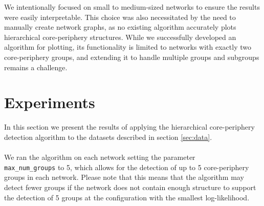 \documentclass[sigconf]{acmart}
\begin{document}
We intentionally focused on small to medium-sized networks to ensure the results were easily interpretable. This choice was also necessitated by the need to manually create network graphs, as no existing algorithm accurately plots hierarchical core-periphery structures. While we successfully developed an algorithm for plotting, its functionality is limited to networks with exactly two core-periphery groups, and extending it to handle multiple groups and subgroups remains a challenge.

\section{Experiments}

In this section we present the results of applying the hierarchical core-periphery detection algorithm to the datasets described in section \ref{sec:data}. 
\\\\We ran the algorithm on each network setting the parameter \\\verb|max_num_groups| to 5, which allows for the detection of up to 5 core-periphery groups in each network.
Please note that this means that the algorithm may detect fewer groups if the network does not contain enough structure to support the detection of 5 groups at the configuration with the smallest log-likelihood.
\end{document}
